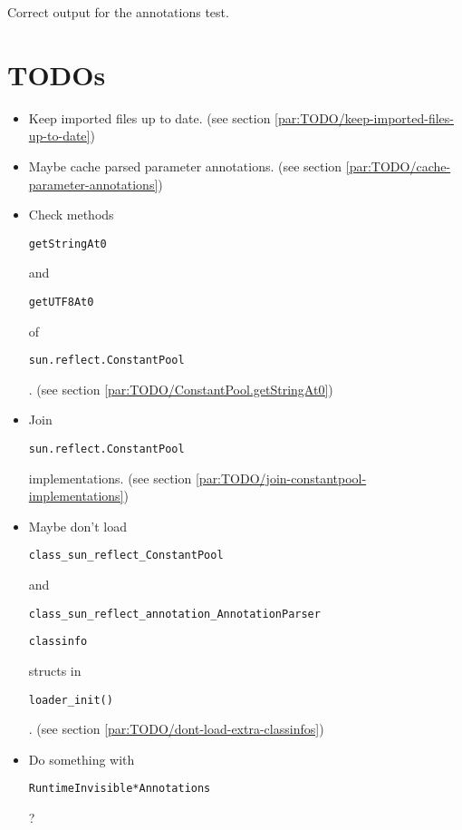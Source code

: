 \documentclass[a4paper, 10pt, titlepage]{scrartcl} %
\begin{document}
Correct output for the annotations test.

\section{TODOs}
\label{sec:todos}
\begin{itemize}
 \item Keep imported files up to date. (see section \ref{par:TODO/keep-imported-files-up-to-date})
 \item Maybe cache parsed parameter annotations. (see section \ref{par:TODO/cache-parameter-annotations})
 \item Check methods \begin{scriptsize}\verb|getStringAt0|\end{scriptsize} and \begin{scriptsize}\verb|getUTF8At0|\end{scriptsize} of \begin{scriptsize}\verb|sun.reflect.ConstantPool|\end{scriptsize}. (see section \ref{par:TODO/ConstantPool.getStringAt0})
 \item Join \begin{scriptsize}\verb|sun.reflect.ConstantPool|\end{scriptsize} implementations. (see section \ref{par:TODO/join-constantpool-implementations})
 \item Maybe don't load \begin{scriptsize}\verb|class_sun_reflect_ConstantPool|\end{scriptsize} and \begin{scriptsize}\verb|class_sun_reflect_annotation_AnnotationParser|\end{scriptsize} \begin{scriptsize}\verb|classinfo|\end{scriptsize} structs in \begin{scriptsize}\verb|loader_init()|\end{scriptsize}. (see section \ref{par:TODO/dont-load-extra-classinfos})
 \item Do something with \begin{scriptsize}\verb|RuntimeInvisible|\hspace{0.0pt}\verb|*|\hspace{0.0pt}\verb|Annotations|\end{scriptsize}?
\end{itemize}



\end{document}
